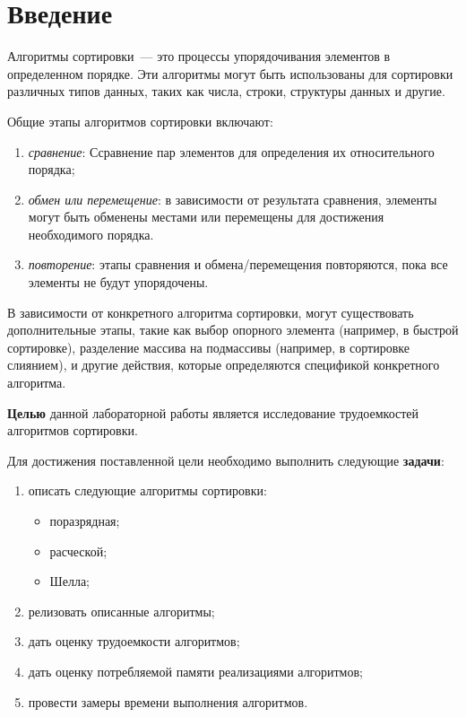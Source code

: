 \chapter*{Введение}

Алгоритмы сортировки~--- это процессы упорядочивания элементов в определенном порядке. Эти алгоритмы могут быть использованы для сортировки различных типов данных, таких как числа, строки, структуры данных и другие.

Общие этапы алгоритмов сортировки включают:
\begin{enumerate}
    \item \textit{сравнение}: Ссравнение пар элементов для определения их относительного порядка;
    \item \textit{обмен или перемещение}: в зависимости от результата сравнения, элементы могут быть обменены местами или перемещены для достижения необходимого порядка.
    \item \textit{повторение}: этапы сравнения и обмена/перемещения повторяются, пока все элементы не будут упорядочены.
\end{enumerate}

В зависимости от конкретного алгоритма сортировки, могут существовать дополнительные этапы, такие как выбор опорного элемента (например, в быстрой сортировке), разделение массива на подмассивы (например, в сортировке слиянием), и другие действия, которые определяются спецификой конкретного алгоритма.\cite{knut}

\textbf{Целью} данной лабораторной работы является исследование трудоемкостей алгоритмов сортировки.

Для достижения поставленной цели необходимо выполнить следующие \textbf{задачи}:
\begin{enumerate}[label={\arabic*)}]
    \item описать следующие алгоритмы сортировки:
        \begin{itemize}
            \item поразрядная;
            \item расческой;
            \item Шелла;
        \end{itemize}
    \item релизовать описанные алгоритмы;
    \item дать оценку трудоемкости алгоритмов;
    \item дать оценку потребляемой памяти реализациями алгоритмов;
    \item провести замеры времени выполнения алгоритмов.
\end{enumerate}
